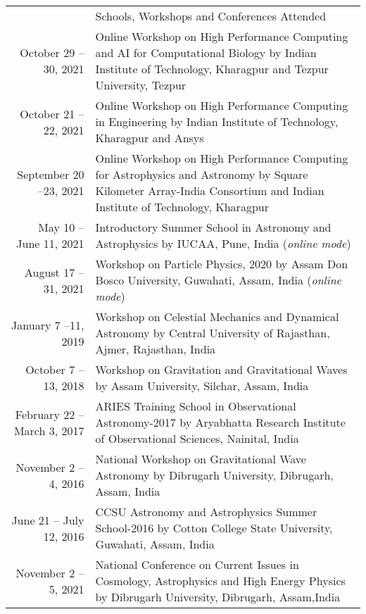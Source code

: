 \documentclass[a4paper, 11pt]{article}
\newcommand{\headingfont}{\Large\color{Peach}}
\newenvironment{SectionTable}[1]{
	\renewcommand*{\arraystretch}{1.7}
	\setlength{\tabcolsep}{10pt}
	\begin{longtable}{Rp{5.2in}} & #1 \\}
{\end{longtable}\vspace{-.3cm}}
\begin{document}
\begin{SectionTable}{\headingfont Schools, Workshops and Conferences Attended}

October 29 -- 30, 2021 & 
Online Workshop on High Performance Computing and AI for Computational Biology by Indian Institute of Technology, Kharagpur and Tezpur University, Tezpur
 \\
October 21 -- 22, 2021 & 
Online Workshop on High Performance Computing in Engineering by Indian Institute of Technology, Kharagpur and Ansys
 \\
 
September 20 --23, 2021 & 
Online Workshop on High Performance Computing for Astrophysics and Astronomy by Square Kilometer Array-India Consortium and Indian Institute of Technology, Kharagpur
 \\

May 10 -- June 11, 2021 &
Introductory Summer School in Astronomy and Astrophysics by IUCAA, Pune, India (\textit{online mode})
\\

August 17 --31, 2021 &
Workshop on Particle Physics, 2020 by Assam Don Bosco University, Guwahati, Assam, India (\textit{online mode})
\\

January 7 --11, 2019 &
Workshop on Celestial Mechanics and Dynamical Astronomy by Central University of Rajasthan, Ajmer, Rajasthan, India
\\

October 7 --13, 2018 &
Workshop on Gravitation and Gravitational Waves by Assam University, Silchar, Assam, India
\\

February 22 -- March 3, 2017 &
ARIES Training School in Observational Astronomy-2017 by Aryabhatta Research Institute of Observational Sciences, Nainital, India
\\

November 2 -- 4, 2016 &
National Workshop on Gravitational Wave Astronomy by Dibrugarh University, Dibrugarh, Assam, India
\\

June 21 -- July 12, 2016 &
CCSU Astronomy and Astrophysics Summer School-2016 by Cotton College State University, Guwahati, Assam, India
\\

November 2 -- 5, 2021 &
National Conference on Current Issues in Cosmology, Astrophysics and High Energy Physics by Dibrugarh University, Dibrugarh, Assam,India
\\
\end{SectionTable}
\end{document}
